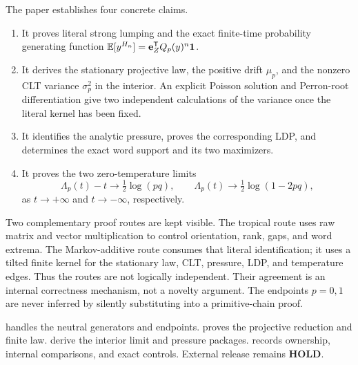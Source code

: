 The paper establishes four concrete claims.
\begin{enumerate}
\item It proves literal strong lumping and the exact finite-time probability
      generating function
      $\mathbb{E}[y^{H_n}]=\mathbf e_{Z}^{\mathsf T}Q_p(y)^n\mathbf{1}$.
\item It derives the stationary projective law, the positive drift $\mu_p$,
      and the nonzero CLT variance $\sigma_p^2$ in the interior.  An explicit
      Poisson solution and Perron-root differentiation give two independent
      calculations of the variance once the literal kernel has been fixed.
\item It identifies the analytic pressure, proves the corresponding LDP,
      and determines the exact word support and its two maximizers.
\item It proves the two zero-temperature limits
      \[
       \Lambda_p(t)-t\longrightarrow\tfrac12\log(pq),\qquad
       \Lambda_p(t)\longrightarrow\tfrac12\log(1-2pq),
      \]
      as $t\to+\infty$ and $t\to-\infty$, respectively.
\end{enumerate}

Two complementary proof routes are kept visible.  The tropical route uses raw matrix and
vector multiplication to control orientation, rank, gaps, and word extrema.
The Markov-additive route consumes that literal identification; it
uses a tilted finite kernel for the stationary law, CLT, pressure, LDP, and
temperature edges.  Thus the routes are not logically independent.  Their
agreement is an internal correctness mechanism,
not a novelty argument.  The endpoints $p=0,1$ are never inferred by silently
substituting into a primitive-chain proof.

 handles the neutral generators and endpoints.
 proves the projective reduction and finite law.
 derive the interior limit and pressure
packages.   records ownership, internal comparisons, and exact
controls.  External release remains \textbf{HOLD}.
